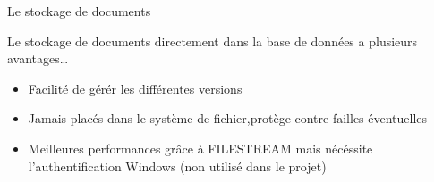 \begin{frame}{Le stockage de documents}

  Le stockage de documents directement dans la base de données a plusieurs avantages\dots
  \begin{itemize}
  \item Facilité de gérér les différentes versions
  \item Jamais placés dans le système de fichier,protège contre failles éventuelles
  \item Meilleures performances grâce à FILESTREAM mais nécéssite l'authentification Windows (non utilisé dans le projet)
  \end{itemize}
\end{frame}